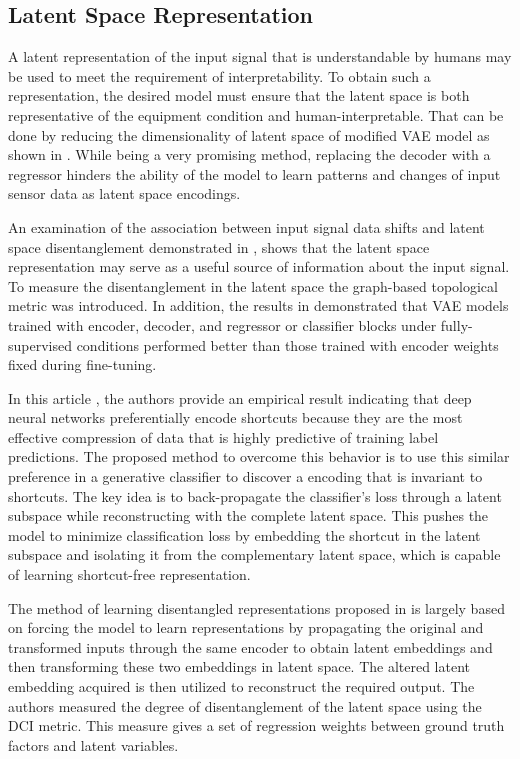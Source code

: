 \subsection{Latent Space Representation}

A latent representation of the input signal that is understandable by humans may be used to meet the requirement of interpretability. To obtain such a representation, the desired model must ensure that the latent space is both representative of the equipment condition and human-interpretable. That can be done by reducing the dimensionality of latent space of modified VAE model as shown in \cite{COSTA2022108353}. While being a very promising method, replacing the decoder with a regressor hinders the ability of the model to learn patterns and changes of input sensor data as latent space encodings. 

An examination of the association between input signal data shifts and latent space disentanglement demonstrated in \cite{EEG2022}, shows that the latent space representation may serve as a useful source of information about the input signal. To measure the disentanglement in the latent space the graph-based topological metric was introduced. In addition, the results in \cite{EEG2022} demonstrated that VAE models trained with encoder, decoder, and regressor or classifier blocks under fully-supervised conditions performed better than those trained with encoder weights fixed during fine-tuning. 

In this article \cite{CHROMAVAE2022}, the authors provide an empirical result indicating that deep neural networks preferentially encode shortcuts because they are the most effective compression of data that is highly predictive of training label predictions. The proposed method to overcome this behavior is to use this similar preference in a generative classifier to discover a encoding that is invariant to shortcuts. The key idea is to back-propagate the classifier's loss through a latent subspace while reconstructing with the complete latent space. This pushes the model to minimize classification loss by embedding the shortcut in the latent subspace and isolating it from the complementary latent space, which is capable of learning shortcut-free representation.

The method of learning disentangled representations proposed in \cite{LOSTLS2022} is largely based on forcing the model to learn representations by propagating the original and transformed inputs through the same encoder to obtain latent embeddings and then transforming these two embeddings in latent space. The altered latent embedding acquired is then utilized to reconstruct the required output. The authors measured the degree of disentanglement of the latent space using the DCI metric. This measure gives a set of regression weights between ground truth factors and latent variables.

